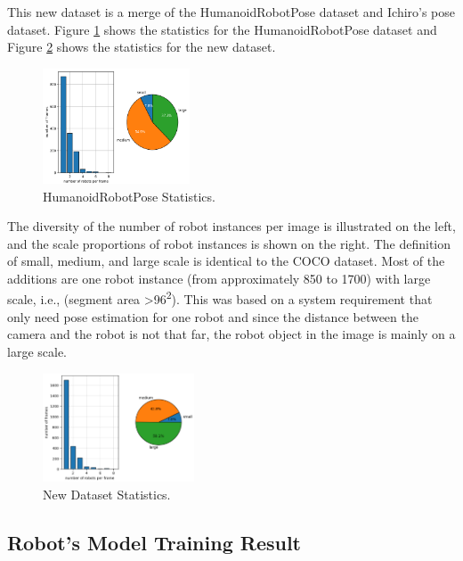 This new dataset is a merge of the HumanoidRobotPose dataset and Ichiro's pose dataset. Figure \ref{fig:nimbro-statistics} shows the statistics for the HumanoidRobotPose dataset \citep{amini2021} and Figure \ref{fig:new-dataset-statistics} shows the statistics for the new dataset.
\begin{figure}[ht]
  \centering
  \includegraphics[width=0.39\textwidth]{gambar/old_dataset.png}
  \caption{HumanoidRobotPose Statistics.}
  \label{fig:nimbro-statistics}
\end{figure}
The diversity of the number of robot instances per image is illustrated on the left, and the scale proportions of robot instances is shown on the right. The definition of small, medium, and large scale is identical to the COCO dataset.
Most of the additions are one robot instance (from approximately 850 to 1700) with large scale, i.e., (segment area \textgreater 96\textsuperscript{2}). 
This was based on a system requirement that only need pose estimation for one robot and since the distance between the camera and the robot is not that far, the robot object in the image is mainly on a large scale.
\begin{figure}[ht]
  \centering
  \includegraphics[width=0.4\textwidth]{gambar/new_dataset.png}
  \caption{New Dataset Statistics.}
  \label{fig:new-dataset-statistics}
\end{figure}


\subsection{Robot's Model Training Result}
\label{subsec:robotmodeltrainingresult}

